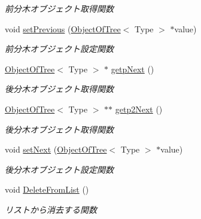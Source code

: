 \begin{DoxyCompactItemize}
\begin{DoxyCompactList}\small\item\em 前分木オブジェクト取得関数 \end{DoxyCompactList}\item 
void \mbox{\hyperlink{class_object_of_tree_aa1c690712242605313686bc0a90adf72}{set\+Previous}} (\mbox{\hyperlink{class_object_of_tree}{Object\+Of\+Tree}}$<$ Type $>$ $\ast$value)
\begin{DoxyCompactList}\small\item\em 前分木オブジェクト設定関数 \end{DoxyCompactList}\item 
\mbox{\hyperlink{class_object_of_tree}{Object\+Of\+Tree}}$<$ Type $>$ $\ast$ \mbox{\hyperlink{class_object_of_tree_a4bf7eb4fdf8928f21ae1a1559f714add}{getp\+Next}} ()
\begin{DoxyCompactList}\small\item\em 後分木オブジェクト取得関数 \end{DoxyCompactList}\item 
\mbox{\hyperlink{class_object_of_tree}{Object\+Of\+Tree}}$<$ Type $>$ $\ast$$\ast$ \mbox{\hyperlink{class_object_of_tree_aa7216634a8de796d6f5cc19f3cd62ed5}{getp2\+Next}} ()
\begin{DoxyCompactList}\small\item\em 後分木オブジェクト取得関数 \end{DoxyCompactList}\item 
void \mbox{\hyperlink{class_object_of_tree_af1ccf3668093728d3eb8d7ed9eee6419}{set\+Next}} (\mbox{\hyperlink{class_object_of_tree}{Object\+Of\+Tree}}$<$ Type $>$ $\ast$value)
\begin{DoxyCompactList}\small\item\em 後分木オブジェクト設定関数 \end{DoxyCompactList}\item 
void \mbox{\hyperlink{class_object_of_tree_a1356595b29749ca4555ca61a5bb30388}{Delete\+From\+List}} ()
\begin{DoxyCompactList}\small\item\em リストから消去する関数 \end{DoxyCompactList}\end{DoxyCompactItemize}
